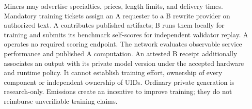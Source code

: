 Miners may advertise specialties, prices, length limits, and delivery
times. Mandatory training tickets assign an A requester to a B rewrite
provider on authorized text. A contributes published artifacts; B runs
them locally for training and submits its benchmark self-scores for
independent validator replay. A operates no required scoring endpoint.
The network evaluates observable service performance and published A
computation. An attested B receipt additionally associates an output with
its private model version under the accepted hardware and runtime policy.
It cannot establish training effort, ownership of every component or
independent ownership of UIDs. Ordinary private generation is research-only.
Emissions create an incentive to improve training; they do not reimburse
unverifiable training claims.
